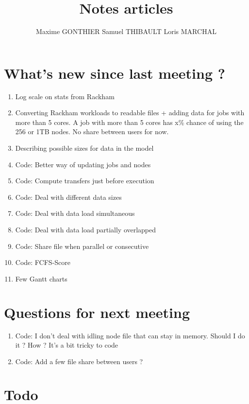 \documentclass[a4paper]{article}
\title{Notes articles}
\author{Maxime GONTHIER Samuel THIBAULT Loris MARCHAL}
\begin{document}
\newpage

\section{What's new since last meeting ?}

	\begin{enumerate}
		\item Log scale on stats from Rackham
		\item Converting Rackham workloads to readable files + adding data for jobs with more than 5 cores. A job with more than 5 cores has x\% chance of using the 256 or 1TB nodes. No share between users for now.
		\item Describing possible sizes for data in the model
		\item Code: Better way of updating jobs and nodes
		\item Code: Compute transfers just before execution
		\item Code: Deal with different data sizes
		\item Code: Deal with data load simultaneous
		\item Code: Deal with data load partially overlapped
		\item Code: Share file when parallel or consecutive
		\item Code: FCFS-Score
		\item Few Gantt charts
	\end{enumerate}
	
\section{Questions for next meeting}

	\begin{enumerate}
		\item Code: I don't deal with idling node file that can stay in memory. Should I do it ? How ? It's a bit tricky to code
		\item Code: Add a few file share between users ?
	\end{enumerate}

\section{Todo}
\end{document}
